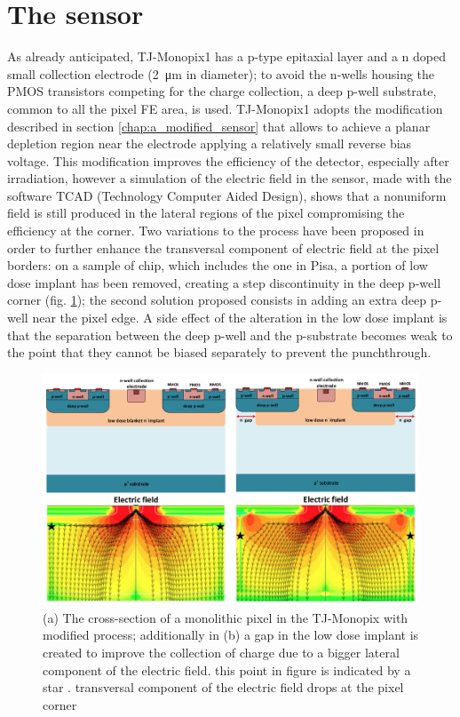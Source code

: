 \section{The sensor}\label{chapter:TJMonopix1_thesensor}
    As already anticipated, TJ-Monopix1 has a p-type epitaxial layer and a n doped small collection electrode (\SI{2}{\um} in diameter); to avoid the n-wells housing the PMOS transistors competing for the charge collection, a deep p-well substrate, common to all the pixel FE area, is used.
    TJ-Monopix1 adopts the modification described in section \ref{chap:a_modified_sensor} that allows to achieve a planar depletion region near the electrode applying a relatively small reverse bias voltage.
    This modification improves the efficiency of the detector, especially after irradiation, however a simulation of the electric field in the sensor, made with the software TCAD (Technology Computer Aided Design), shows that a nonuniform field is still produced in the lateral regions of the pixel compromising the efficiency at the corner.
    Two variations to the process have been proposed in order to further enhance the transversal component of electric field at the pixel borders: on a sample of chip, which includes the one in Pisa, a portion of low dose implant has been removed, creating a step discontinuity in the deep p-well corner (fig. \ref{fig:Monopix1_section_scheme}); the second solution proposed\cite{MOUSTAKAS THESYS, PAG 58} consists in adding an extra deep p-well near the pixel edge.
    A side effect of the alteration in the low dose implant is that the separation between the deep p-well and the p-substrate becomes weak to the point that they cannot be biased separately to prevent the punchthrough. 

    \begin{figure}[h!]
        \centering
        \includegraphics[width=.9\linewidth]{figures/Monopix1/Monopix1_section_scheme.png}
        \caption{(a) The cross-section of a monolithic pixel in the TJ-Monopix with modified process; additionally in (b) a gap in the low dose implant is created to improve the collection of charge due to a bigger lateral component of the electric field. this point in figure  is indicated by a star . transversal component of the electric field drops at the pixel corner}
        \label{fig:Monopix1_section_scheme}
    \end{figure}

